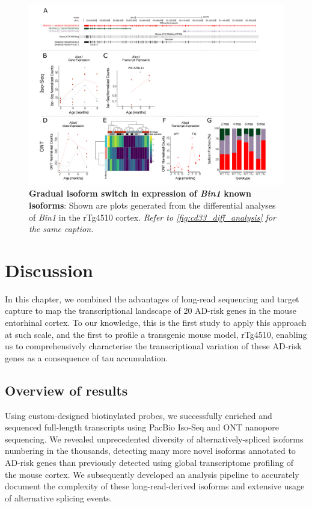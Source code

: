 \begin{landscape}
	\begin{figure}[htp]
		\begin{center}
			\includegraphics[page=6,trim={0 0.5cm 0 1.5cm},scale =0.85]{Figures/TargetGene_DifferentialAnalysis.pdf}
		\end{center}
		\captionsetup{width=1.5\textwidth}
		\caption[Differential \textit{Bin1} transcript expression and usage]%
		{\textbf{Gradual isoform switch in expression of \textit{Bin1} known isoforms}: Shown are plots generated from the differential analyses of \textit{Bin1} in the rTg4510 cortex. \textit{Refer to \cref{fig:cd33_diff_analysis} for the same caption.}}   
		\label{fig:bin1_diff_analysis}
	\end{figure}
\end{landscape}



\newpage
\section{Discussion}
In this chapter, we combined the advantages of long-read sequencing and target capture to map the transcriptional landscape of 20 AD-risk genes in the mouse entorhinal cortex. To our knowledge, this is the first study to apply this approach at such scale, and the first to profile a transgenic mouse model, rTg4510, enabling us to comprehensively characterise the transcriptional variation of these AD-risk genes as a consequence of tau accumulation.

\subsection{Overview of results}
Using custom-designed biotinylated probes, we successfully enriched and sequenced full-length transcripts using PacBio Iso-Seq and ONT nanopore sequencing. We revealed unprecedented diversity of alternatively-spliced isoforms numbering in the thousands, detecting many more novel isoforms annotated to AD-risk genes than previously detected using global transcriptome profiling of the mouse cortex. We subsequently developed an analysis pipeline to accurately document the complexity of these long-read-derived isoforms and extensive usage of alternative splicing events. 


